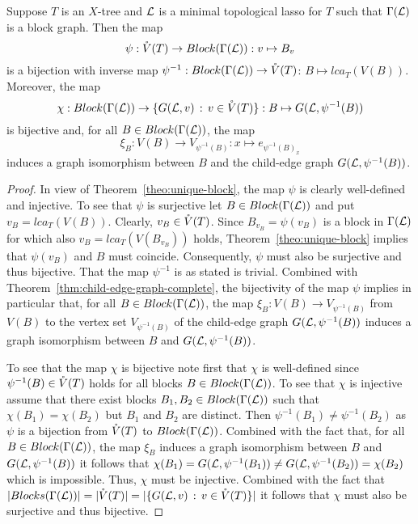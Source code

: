 \begin{cor}\label{cor:bijection}
  Suppose $T$ is an $X$-tree and ${\mathcal L}$ is a minimal topological lasso for $T$
  such that $\Gamma({\mathcal L})$ is a block graph. Then the map
  $$
  \psi:\mathring{V}(T)\to Block(\Gamma({\mathcal L})) : v\mapsto B_v
  $$
  is a bijection with inverse map $\psi^{-1}:Block(\Gamma({\mathcal L}))\to \mathring{V}(T)$:
  $B\mapsto lca_T(V(B))$. Moreover, the map
  $$
  \chi:Block(\Gamma({\mathcal L})) \to \{G({\mathcal L}, v)\,:\, v\in \mathring{V}(T)\}
  : B\mapsto G({\mathcal L},\psi^{-1}(B))
  $$
  is bijective and, for all $B\in Block(\Gamma({\mathcal L}))$, the map
  $$
  \xi_B:V(B) \to V_{\psi^{-1}(B)} 
  : x\mapsto e_{\psi^{-1}(B)_x}
  $$ 
  induces a graph isomorphism between $B$ and the child-edge graph $G({\mathcal L},
  \psi^{-1}(B))$.
\end{cor}
\begin{proof}
  In view of Theorem~\ref{theo:unique-block}, the map $\psi$ is clearly
  well-defined and injective. To see that $\psi$ is surjective let $B\in
  Block(\Gamma({\mathcal L}))$ and put $v_B=lca_T(V(B))$. Clearly, $v_B\in
  \mathring{V}(T)$. Since $B_{v_B}=\psi(v_B)$ is a block in $\Gamma({\mathcal L})$ for which
  also $v_B=lca_T(V(B_{v_B}))$ holds, Theorem~\ref{theo:unique-block} implies
  that $\psi(v_B)$ and $B$ must coincide.  Consequently, $\psi$ must also be
  surjective and thus bijective. That the map $\psi^{-1}$ is as stated is
  trivial.  Combined with Theorem~\ref{thm:child-edge-graph-complete}, the
  bijectivity of the map $\psi$ implies in particular that, for all $B\in
  Block(\Gamma({\mathcal L}))$, the map $\xi_B: V(B) \to V_{\psi^{-1}(B)} $ from $V(B)$
  to the vertex set $V_{\psi^{-1}(B)} $ of the child-edge graph $G({\mathcal L},
  \psi^{-1}(B))$ induces a graph isomorphism between $B$ and $G({\mathcal L},
  \psi^{-1}(B))$.

  To see that the map $\chi$ is bijective note first that $\chi$ is
  well-defined since $\psi^{-1}(B)\in \mathring{V}(T)$ holds for all blocks $B\in
  Block(\Gamma({\mathcal L}))$. To see that $\chi$ is injective assume that there exist
  blocks $B_1,B_2\in Block(\Gamma({\mathcal L}))$ such that $\chi(B_1)=\chi(B_2)$ but
  $B_1$ and $B_2$ are distinct.  Then $\psi^{-1}(B_1)\not= \psi^{-1}(B_2)$ as
  $\psi$ is a bijection from $\mathring{V}(T)$ to $Block(\Gamma({\mathcal L})) $.  Combined with
  the fact that, for all $B\in Block(\Gamma({\mathcal L}))$, the map $\xi_B$ induces a
  graph isomorphism between $B$ and $G({\mathcal L}, \psi^{-1}(B))$ it follows that
  $\chi(B_1)=G({\mathcal L},\psi^{-1}(B_1))\not=G({\mathcal L},\psi^{-1}(B_2))=\chi(B_2)$ which
  is impossible. Thus, $\chi$ must be injective. Combined with the fact that
  $|Blocks(\Gamma({\mathcal L}))|=|\mathring{V}(T)|=|\{G({\mathcal L}, v)\,:\, v\in \mathring{V}(T)\}|$ it follows
  that $\chi$ must also be surjective and thus bijective.
\end{proof}



